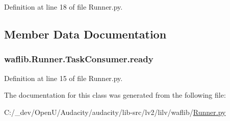 Definition at line 18 of file Runner.\+py.



\subsection{Member Data Documentation}
\subsubsection[{\texorpdfstring{ready}{ready}}]{\setlength{\rightskip}{0pt plus 5cm}waflib.\+Runner.\+Task\+Consumer.\+ready}\hypertarget{classwaflib_1_1_runner_1_1_task_consumer_aada8fd2495ae3751b3cab47b7ddd3dfc}{}\label{classwaflib_1_1_runner_1_1_task_consumer_aada8fd2495ae3751b3cab47b7ddd3dfc}


Definition at line 15 of file Runner.\+py.



The documentation for this class was generated from the following file\+:\begin{DoxyCompactItemize}
\item 
C\+:/\+\_\+dev/\+Open\+U/\+Audacity/audacity/lib-\/src/lv2/lilv/waflib/\hyperlink{lilv_2waflib_2_runner_8py}{Runner.\+py}\end{DoxyCompactItemize}

